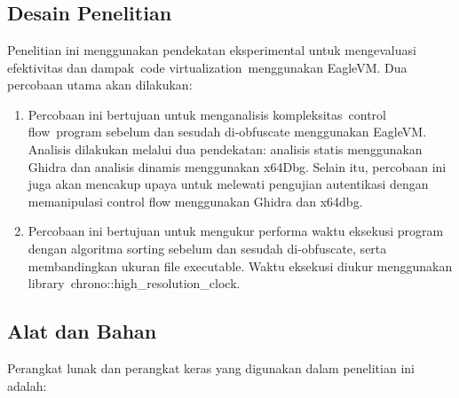\chapter{\babTiga}

\section{Desain Penelitian}
Penelitian ini menggunakan pendekatan eksperimental untuk mengevaluasi efektivitas dan dampak code virtualization menggunakan EagleVM. Dua percobaan utama akan dilakukan:

\begin{enumerate}
	\item {} Percobaan ini bertujuan untuk menganalisis kompleksitas control flow program sebelum dan sesudah di-obfuscate menggunakan EagleVM. Analisis dilakukan melalui dua pendekatan: analisis statis menggunakan Ghidra dan analisis dinamis menggunakan x64Dbg. Selain itu, percobaan ini juga akan mencakup upaya untuk melewati pengujian autentikasi dengan memanipulasi control flow menggunakan Ghidra dan x64dbg.
	\item {} Percobaan ini bertujuan untuk mengukur performa waktu eksekusi program dengan algoritma sorting sebelum dan sesudah di-obfuscate, serta membandingkan ukuran file executable. Waktu eksekusi diukur menggunakan library chrono::high\_resolution\_clock.
\end{enumerate}
\section{Alat dan Bahan}
Perangkat lunak dan perangkat keras yang digunakan dalam penelitian ini adalah:

